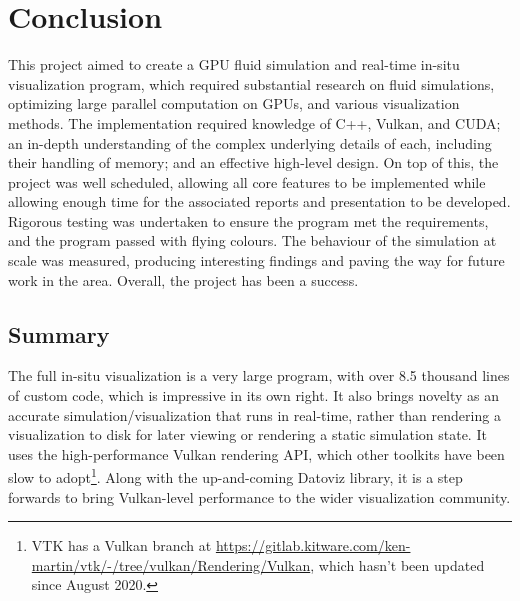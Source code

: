 
\chapter{Conclusion}
\label{sec:Conclusion} 





This project aimed to create a GPU fluid simulation and real-time in-situ visualization program, which required substantial research on fluid simulations, optimizing large parallel computation on GPUs, and various visualization methods.
The implementation required knowledge of C++, Vulkan, and CUDA; an in-depth understanding of the complex underlying details of each, including their handling of memory; and an effective high-level design.
On top of this, the project was well scheduled, allowing all core features to be implemented while allowing enough time for the associated reports and presentation to be developed.
Rigorous testing was undertaken to ensure the program met the requirements, and the program passed with flying colours.
The behaviour of the simulation at scale was measured, producing interesting findings and paving the way for future work in the area.
Overall, the project has been a success.

\section{Summary}
The full in-situ visualization is a very large program, with over 8.5 thousand lines of custom code, which is impressive in its own right.
It also brings novelty as an accurate simulation/visualization that runs in real-time, rather than rendering a visualization to disk for later viewing or rendering a static simulation state.
It uses the high-performance Vulkan rendering API, which other toolkits have been slow to adopt\footnote{VTK has a Vulkan branch at \url{https://gitlab.kitware.com/ken-martin/vtk/-/tree/vulkan/Rendering/Vulkan}, which hasn't been updated since August 2020.}.
Along with the up-and-coming Datoviz library\cite{Datoviz}, it is a step forwards to bring Vulkan-level performance to the wider visualization community.

